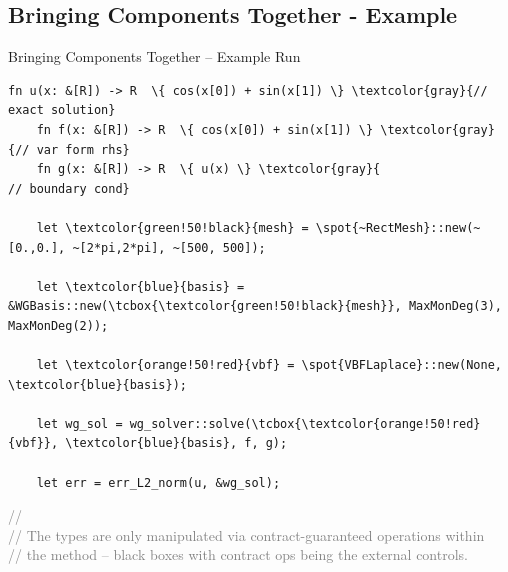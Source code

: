 \documentclass{beamer}
\begin{document}
\subsection{Bringing Components Together - Example}

\begin{frame}[fragile]{Bringing Components Together -- Example Run}
  \begin{Verbatim}[gobble=4, commandchars=\\\{\}, fontsize=\small, fontfamily=tt]
    fn u(x: &[R]) -> R  \{ cos(x[0]) + sin(x[1]) \} \textcolor{gray}{// exact solution}
    fn f(x: &[R]) -> R  \{ cos(x[0]) + sin(x[1]) \} \textcolor{gray}{// var form rhs}
    fn g(x: &[R]) -> R  \{ u(x) \} \textcolor{gray}{                 // boundary cond}

    let \textcolor{green!50!black}{mesh} = \spot{~RectMesh}::new(~[0.,0.], ~[2*pi,2*pi], ~[500, 500]);

    let \textcolor{blue}{basis} = &WGBasis::new(\tcbox{\textcolor{green!50!black}{mesh}}, MaxMonDeg(3), MaxMonDeg(2));

    let \textcolor{orange!50!red}{vbf} = \spot{VBFLaplace}::new(None, \textcolor{blue}{basis});

    let wg_sol = wg_solver::solve(\tcbox{\textcolor{orange!50!red}{vbf}}, \textcolor{blue}{basis}, f, g);

    let err = err_L2_norm(u, &wg_sol);
  \end{Verbatim}
  \footnotesize {
    \textcolor{gray}{// }\\
    \textcolor{gray}{// The types are only manipulated via contract-guaranteed operations within\\
      // the method -- black boxes with contract ops being the external controls.}
  }

\end{frame}
\end{document}
